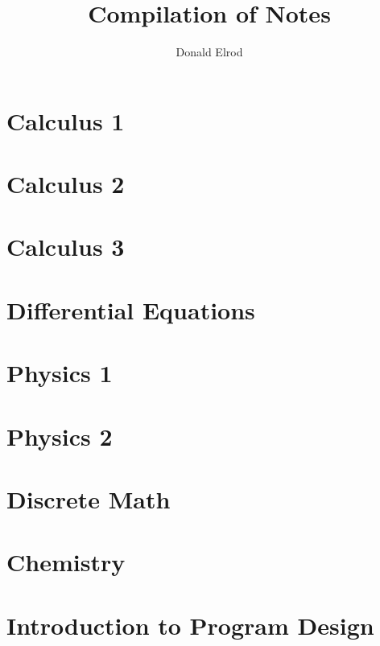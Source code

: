 \documentclass[12pt, letterpaper]{memoir}
\title{Compilation of Notes}
\author{Donald Elrod}
\begin{document}
\maketitle

\clearpage
	
\tableofcontents

\clearpage


\part{Calculus 1}


\part{Calculus 2}


\part{Calculus 3}


\part{Differential Equations}


\part{Physics 1}


\part{Physics 2}


\part{Discrete Math}


\part{Chemistry}







\part{Introduction to Program Design}
\end{document}
